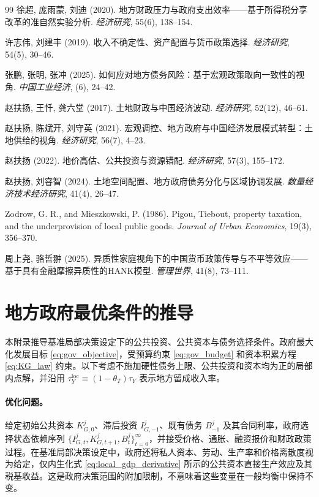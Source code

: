 \documentclass[12pt,UTF8]{ctexart}
\begin{document}
\begin{thebibliography}{99}
		徐超, 庞雨蒙, 刘迪 (2020). 地方财政压力与政府支出效率——基于所得税分享改革的准自然实验分析. \textit{经济研究}, 55(6), 138--154.
		
		许志伟, 刘建丰 (2019). 收入不确定性、资产配置与货币政策选择. \textit{经济研究}, 54(5), 30--46.
		
		张鹏, 张明, 张冲 (2025). 如何应对地方债务风险：基于宏观政策取向一致性的视角. \textit{中国工业经济}, (6), 24--42.
		
		赵扶扬, 王忏, 龚六堂 (2017). 土地财政与中国经济波动. \textit{经济研究}, 52(12), 46--61.
		
		赵扶扬, 陈斌开, 刘守英 (2021). 宏观调控、地方政府与中国经济发展模式转型：土地供给的视角. \textit{经济研究}, 56(7), 4--23.
		
		赵扶扬 (2022). 地价高估、公共投资与资源错配. \textit{经济研究}, 57(3), 155--172.
		
		赵扶扬, 刘睿智 (2024). 土地空间配置、地方政府债务分化与区域协调发展. \textit{数量经济技术经济研究}, 41(4), 26--47.
		
		Zodrow, G. R., and Mieszkowski, P. (1986). Pigou, Tiebout, property taxation, and the underprovision of local public goods. \textit{Journal of Urban Economics}, 19(3), 356--370.
		
		周上尧, 骆哲翀 (2025). 异质性家庭视角下的中国货币政策传导与不平等效应——基于具有金融摩擦异质性的HANK模型. \textit{管理世界}, 41(8), 73--111.
		
	\end{thebibliography}
	
	\newpage
	\appendix
	\section{地方政府最优条件的推导}
	\label{app:gov_derivation}
	
	本附录推导基准局部决策设定下的公共投资、公共资本与债务选择条件。政府最大化发展目标 \eqref{eq:gov_objective}，受预算约束 \eqref{eq:gov_budget} 和资本积累方程 \eqref{eq:KG_law} 约束。以下考虑不施加硬性债务上限、公共投资和资本均为正的局部内点解，并沿用 $\tau_Y^{\mathrm{loc}}\equiv(1-\theta_T)\tau_Y$ 表示地方留成收入率。
	
	\paragraph{优化问题。}
	给定初始公共资本 $K_{G,0}^j$、滞后投资 $I_{G,-1}^j$、既有债务 $B_{-1}^j$ 及其合同利率，政府选择状态依赖序列 $\{I_{G,t}^j,K_{G,t+1}^j,B_t^j\}_{t=0}^{\infty}$，并接受价格、通胀、融资报价和财政政策过程。在基准局部决策设定中，政府还将私人资本、劳动、生产率和价格离散度视为给定，仅内生化式 \eqref{eq:local_gdp_derivative} 所示的公共资本直接生产效应及其税基收益。这是政府决策范围的附加限制，不意味着这些变量在一般均衡中保持不变。
	
\end{document}
